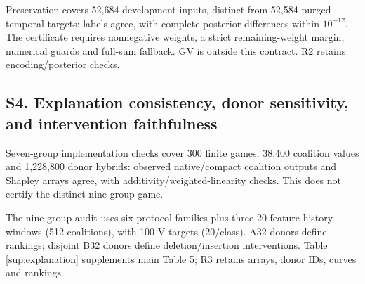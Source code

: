 \documentclass[10pt,a4paper]{article}
\begin{document}
Preservation covers 52,684 development inputs, distinct from 52,584 purged temporal targets: labels agree, with complete-posterior differences within \(10^{-12}\). The certificate requires nonnegative weights, a strict remaining-weight margin, numerical guards and full-sum fallback. GV is outside this contract. R2 retains encoding/posterior checks.

\subsection*{S4. Explanation consistency, donor sensitivity, and intervention faithfulness}

Seven-group implementation checks cover 300 finite games, 38,400 coalition values and 1,228,800 donor hybrids: observed native/compact coalition outputs and Shapley arrays agree, with additivity/weighted-linearity checks. This does not certify the distinct nine-group game.

The nine-group audit uses six protocol families plus three 20-feature history windows (512 coalitions), with 100 V targets (20/class). A32 donors define rankings; disjoint B32 donors define deletion/insertion interventions. Table \ref*{sup:explanation} supplements main Table 5; R3 retains arrays, donor IDs, curves and rankings.
\end{document}
